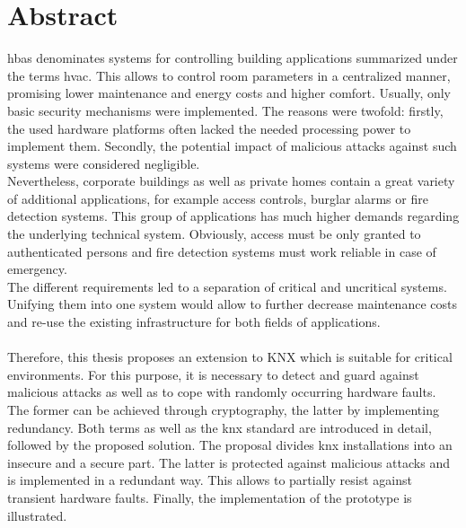 \chapter*{Abstract}
\gls{hbas} denominates systems for controlling building applications summarized under the terms \gls{hvac}. This allows to control room parameters in a centralized manner, 
promising lower maintenance and energy costs and higher comfort. Usually, only basic security mechanisms were implemented. The reasons were twofold:
firstly, the used hardware platforms often lacked the needed processing power to implement them.
Secondly, the potential impact of malicious attacks against such systems were considered negligible.
\\
Nevertheless, corporate buildings as well as private homes contain a great variety of additional applications, for example access controls, burglar alarms or fire detection systems.
This group of applications has much higher demands regarding the underlying technical system. Obviously, access must be only granted to authenticated persons and fire detection
systems must work reliable in case of emergency. 
\\
The different requirements led to a separation of critical and uncritical systems. Unifying them into one system would allow to further decrease maintenance costs and re-use
the existing infrastructure for both fields of applications.
\\
\\
Therefore, this thesis proposes an extension to KNX which is suitable for critical environments. For this purpose, it is necessary to detect and guard against malicious attacks
as well as to cope with randomly occurring hardware faults. The former can be achieved through cryptography, the latter by implementing redundancy. Both terms as well as the \gls{knx}
standard are introduced in detail, followed by the proposed solution. The proposal divides \gls{knx} installations into an insecure and a secure part. The latter is protected against
malicious attacks and is implemented in a redundant way. This allows to partially resist against transient hardware faults. Finally, the implementation of the prototype is illustrated.
